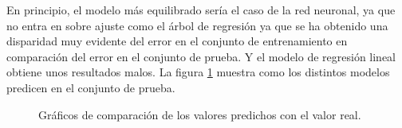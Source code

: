 \noindent En principio, el modelo más equilibrado sería el caso de la red neuronal, ya que no entra en sobre ajuste como el árbol de regresión ya que se ha obtenido una disparidad muy evidente del error en el conjunto de entrenamiento en comparación del error en el conjunto de prueba. Y el modelo de regresión lineal obtiene unos resultados malos. La figura \ref{fig: comparación} muestra como los distintos modelos predicen en el conjunto de prueba.

%   
%    
% 
%  
% 

\begin{figure}[h]
 \centering
 \caption{Gráficos de comparación de los valores predichos con el valor real.}
  \label{fig: comparación}
\end{figure}




